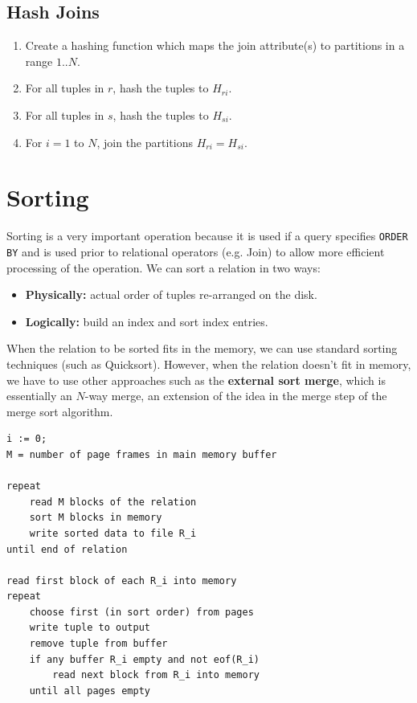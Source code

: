\documentclass[a4paper,11pt]{article}
\begin{document}
\subsection{Hash Joins}
\begin{enumerate}
    \item   Create a hashing function which maps the join attribute(s) to partitions in a range $1 .. N$. 
    \item   For all tuples in $r$, hash the tuples to $H_{ri}$.
    \item   For all tuples in $s$, hash the tuples to $H_{si}$.
    \item   For $i = 1$ to $N$, join the partitions $H_{ri} = H_{si}$.
\end{enumerate}

\section{Sorting}
Sorting is a very important operation because it is used if a query specifies \texttt{ORDER BY} and is 
used prior to relational operators (e.g. Join) to allow more efficient processing of the operation.
We can sort a relation in two ways:
\begin{itemize}
    \item   \textbf{Physically:} actual order of tuples re-arranged on the disk.
    \item   \textbf{Logically:} build an index and sort index entries.
\end{itemize}

When the relation to be sorted fits in the memory, we can use standard sorting techniques (such as Quicksort).
However, when the relation doesn't fit in memory, we have to use other approaches such as the \textbf{external 
sort merge}, which is essentially an $N$-way merge, an extension of the idea in the merge step of the merge sort 
algorithm.

\begin{verbatim}
i := 0;
M = number of page frames in main memory buffer

repeat 
    read M blocks of the relation 
    sort M blocks in memory
    write sorted data to file R_i
until end of relation 

read first block of each R_i into memory
repeat 
    choose first (in sort order) from pages
    write tuple to output
    remove tuple from buffer
    if any buffer R_i empty and not eof(R_i)
        read next block from R_i into memory
    until all pages empty
\end{verbatim}
\end{document}
